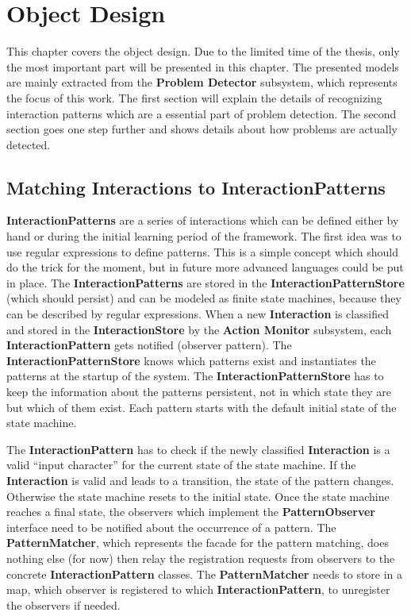 \chapter{Object Design}
\label{object_design}


This chapter covers the object design. Due to the limited time of the thesis,
only the most important part will be presented in this chapter. The presented
models are mainly extracted from the \textbf{Problem Detector} subsystem, which
represents the focus of this work. The first section will explain the
details of recognizing interaction patterns which are a essential part of
problem detection. The second section goes one step further and shows details
about how problems are actually detected.

\section{Matching Interactions to InteractionPatterns}

\textbf{InteractionPatterns} are a series of interactions which can be defined either
by hand or during the initial learning period of the framework. The first idea was to 
use regular expressions to define patterns. This is a simple concept which should do
the trick for the moment, but in future more advanced languages could be put in place.
The \textbf{InteractionPatterns} are stored in the \textbf{InteractionPatternStore} (which should
persist) and can be modeled as finite state machines, because they can be described
by regular expressions. When a new \textbf{Interaction} is classified and stored in the
\textbf{InteractionStore} by the \textbf{Action Monitor} subsystem, each
\textbf{InteractionPattern} gets notified (observer pattern).
The \textbf{InteractionPatternStore} knows which patterns exist and
instantiates the patterns at the startup of the system. The
\textbf{InteractionPatternStore} has to keep the information about the
patterns persistent, not in which state they are but which of them
exist. Each pattern starts with the default initial state of the state machine.

The \textbf{InteractionPattern} has to check if the newly classified \textbf{Interaction}
is a valid ``input character'' for the current state of the state machine.
If the \textbf{Interaction} is valid and leads to a transition, the state of
the pattern changes. Otherwise the state machine resets to the initial state. Once the state machine
reaches a final state, the observers which implement the
\textbf{PatternObserver} interface need to be notified
about the occurrence of a pattern. The
\textbf{PatternMatcher}, which represents the facade for the pattern matching,
does nothing else (for now) then relay the registration requests from observers to the
concrete \textbf{InteractionPattern} classes.
The \textbf{PatternMatcher} needs to store in a map, which observer is registered
to which \textbf{InteractionPattern}, to unregister the observers if needed.

